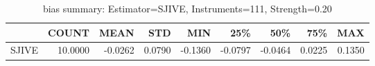 \begin{table}[ht]
\centering
\caption{bias summary: Estimator=SJIVE, Instruments=111, Strength=0.20}
\begin{tabular}{lrrrrrrrr}
\toprule
 & COUNT & MEAN & STD & MIN & 25\% & 50\% & 75\% & MAX \\
\midrule
SJIVE & 10.0000 & -0.0262 & 0.0790 & -0.1360 & -0.0797 & -0.0464 & 0.0225 & 0.1350 \\
\bottomrule
\end{tabular}
\end{table}
